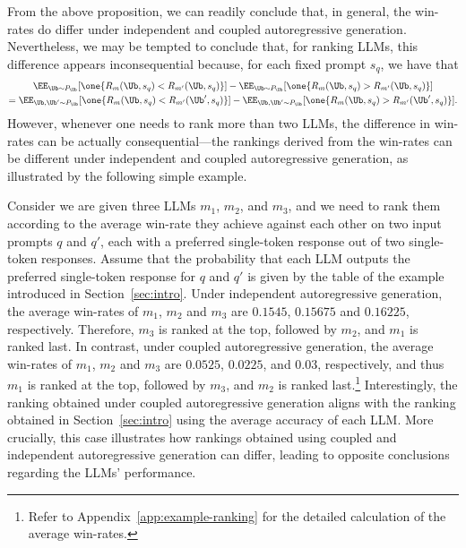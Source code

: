 %
From the above proposition, we can readily conclude that, in general, the win-rates do differ under independent and coupled autoregressive generation. Nevertheless, we may be tempted to conclude that, for ranking LLMs, 
%
this difference appears inconsequential because, for each fixed prompt $s_q$, we have that
%
\begin{multline*}
\EE_{\Ub\sim P_{\Ub}}[\one\{R_m(\Ub, s_q)<R_{m'}(\Ub, s_q)\}] - \EE_{\Ub\sim P_{\Ub}}[\one\{R_m(\Ub, s_q)>R_{m'}(\Ub, s_q)\}] \\ 
= \EE_{\Ub, \Ub' \sim P_{\Ub}}[\one\{R_m(\Ub, s_q)<R_{m'}(\Ub', s_q)\}] - \EE_{\Ub, \Ub' \sim P_{\Ub}}[\one\{R_m(\Ub, s_q)>R_{m'}(\Ub', s_q)\}].
\end{multline*}
%
However, whenever one needs to rank more than two LLMs, the difference in win-rates can be actually consequential---the rankings derived from the win-rates can be different under independent and coupled autoregressive generation, as illustrated by the following simple example.

Consider we are given three LLMs $m_1$, $m_2$, and $m_3$, and we need to rank them according to the average win-rate they achieve against each other on two input prompts $q$ and $q'$, each with a preferred single-token response out of two single-token responses.
%
Assume that the probability that each LLM outputs the preferred single-token response for $q$ and $q'$ is given by the table of the example introduced in Section~\ref{sec:intro}.
%
Under independent autoregressive generation, the average win-rates of $m_1$, $m_2$ and $m_3$ are $0.1545$, $0.15675$ and $0.16225$, respectively. Therefore, $m_3$ is ranked at the top, followed by $m_2$, and $m_1$ is ranked last. 
%
In contrast, under coupled autoregressive generation, the average win-rates of $m_1$, $m_2$ and $m_3$ are $0.0525$, $0.0225$, and $0.03$, respectively, and thus $m_1$ is ranked at the top, followed by $m_3$, and $m_2$ is ranked last.\footnote{Refer to Appendix~\ref{app:example-ranking} for the detailed calculation of the average win-rates.} Interestingly, the ranking obtained under coupled autoregressive generation aligns with the ranking obtained in Section~\ref{sec:intro} using the average accuracy of each LLM. More crucially, this case illustrates how rankings obtained using coupled and independent autoregressive generation can differ, leading to opposite conclusions regarding the LLMs' performance.

